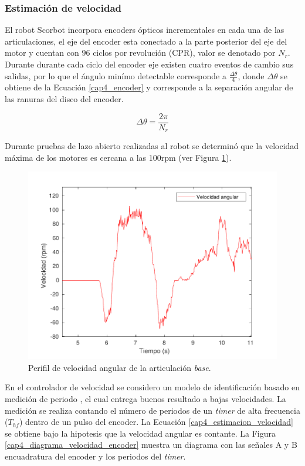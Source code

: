 \subsubsection{Estimación de velocidad}

El robot Scorbot incorpora encoders ópticos incrementales en cada una de las articulaciones, el eje del encoder esta conectado a la parte posterior del eje del motor y cuentan con $96$ ciclos por revolución (CPR), valor se denotado por $N_r$. Durante durante cada ciclo del encoder eje existen cuatro eventos de cambio sus salidas, por lo que el ángulo minímo detectable corresponde a $\frac{\Delta\theta}{4}$, donde $\Delta\theta$ se obtiene de la Ecuación \ref{cap4_encoder} y corresponde a la separación angular de las ranuras del disco del encoder.

\begin{equation}\label{cap4_encoder}
\Delta\theta = \frac{2\pi}{N_r}
\end{equation}

Durante pruebas de lazo abierto realizadas al robot se determinó que la velocidad máxima de los motores es cercana a las \si{100}{rpm} (ver Figura \ref{cap4_max_velocidad}).

\begin{figure}[ht]
  \centering
  \includegraphics[scale=0.6]{img/cap4/max_velocidad}
  \caption{Perifil de velocidad angular de la articulación \textit{base}.}
  \label{cap4_max_velocidad}
\end{figure}

En el controlador de velocidad se considero un modelo de identificación basado en medición de periodo \cite{Petrella2007}, el cual entrega buenos resultado a bajas velocidades. La medición se realiza contando el número de periodos de un \textit{timer} de alta frecuencia ($T_{hf}$) dentro de un pulso del encoder. La Ecuación \ref{cap4_estimacion_velocidad} se obtiene bajo la hipotesis que la velocidad angular es contante. La Figura \ref{cap4_diagrama_velocidad_encoder} muestra un diagrama con las señales A y B encuadratura del encoder y los periodos del \textit{timer}.

